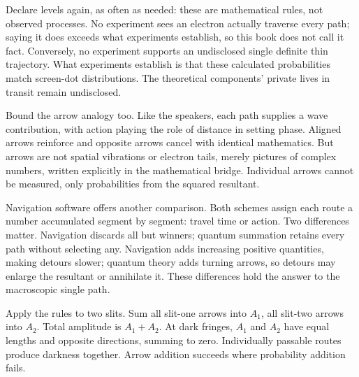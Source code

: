 Declare levels again, as often as needed: these are mathematical rules, not observed processes. No experiment sees an electron actually traverse every path; saying it does exceeds what experiments establish, so this book does not call it fact. Conversely, no experiment supports an undisclosed single definite thin trajectory. What experiments establish is that these calculated probabilities match screen-dot distributions. The theoretical components' private lives in transit remain undisclosed.

Bound the arrow analogy too. Like the speakers, each path supplies a wave contribution, with action playing the role of distance in setting phase. Aligned arrows reinforce and opposite arrows cancel with identical mathematics. But arrows are not spatial vibrations or electron tails, merely pictures of complex numbers, written explicitly in the mathematical bridge. Individual arrows cannot be measured, only probabilities from the squared resultant.

Navigation software offers another comparison. Both schemes assign each route a number accumulated segment by segment: travel time or action. Two differences matter. Navigation discards all but winners; quantum summation retains every path without selecting any. Navigation adds increasing positive quantities, making detours slower; quantum theory adds turning arrows, so detours may enlarge the resultant or annihilate it. These differences hold the answer to the macroscopic single path.

\begin{center}
\end{center}

Apply the rules to two slits. Sum all slit-one arrows into \(A_1\), all slit-two arrows into \(A_2\). Total amplitude is \(A_1+A_2\). At dark fringes, \(A_1\) and \(A_2\) have equal lengths and opposite directions, summing to zero. Individually passable routes produce darkness together. Arrow addition succeeds where probability addition fails.


